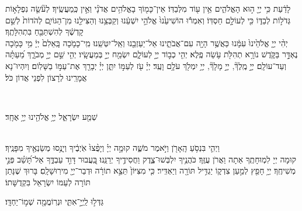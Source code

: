 \documentclass[twoside, openany, parskip=half, 11pt]{book}
\begin{document}

לָדַ֔עַת כִּ֥י יְיָ֖ ה֣וּא הָאֱלֹהִ֑ים אֵ֥ין ע֖וֹד מִלְּבַדּֽוֹ׃ \hfill \break
אֵין־כָּמ֖וֹךָ בָאֱלֹהִ֥ים אֲדֹנָ֗י וְאֵ֣ין כְּֽמַעֲשֶֽׂיךָ׃ \hfill \break
לְעֹ֘שֵׂ֤ה נִפְלָא֣וֹת גְּדֹל֣וֹת לְבַדּ֑וֹ כִּ֖י לְעוֹלָ֣ם חַסְדּֽוֹ׃ \hfill \break
וְאִמְר֕וּ הוֹשִׁיעֵ֙נוּ֙ אֱלֹהֵ֣י יִשְׁעֵ֔נוּ וְקַבְּצֵ֥נוּ וְהַצִּילֵ֖נוּ מִן־הַגּוֹיִ֑ם לְהֹדוֹת֙ לְשֵׁ֣ם קָדְשֶׁ֔ךָ לְהִשְׁתַּבֵּ֖חַ בִּתְהִלָּתֶֽךָ׃\\
יְהִ֨י יְיָ֤ אֱלֹהֵ֙ינוּ֙ עִמָּ֔נוּ כַּאֲשֶׁ֥ר הָיָ֖ה עִם־אֲבֹתֵ֑ינוּ אַל־יַעַזְבֵ֖נוּ וְאַֽל־יִטְּשֵֽׁנוּ׃ \hfill \break
מִֽי־כָמֹ֤כָה בָּֽאֵלִם֙ יְיָ֔ מִ֥י כָּמֹ֖כָה נֶאְדָּ֣ר בַּקֹּ֑דֶשׁ נוֹרָ֥א תְהִלֹּ֖ת עֹ֥שֵׂה פֶֽלֶא׃ \hfill \break
יְהִ֤י כְב֣וֹד יְיָ֣ לְעוֹלָ֑ם יִשְׂמַ֖ח יְיָ֣ בְּמַעֲשָֽׂיו׃ \hfill \break
יְהִ֤י שֵׁ֣ם יְיָ֣ מְבֹרָ֑ךְ מֵ֝עַתָּ֗ה וְעַד־עוֹלָֽם׃ \hfill \break
יְיָ֣ מֶֽלֶךְ֘, יְיָ֣ מָלָךְ֘, יְיָ֥ יִמְלֹ֖ךְ עֹלָ֥ם וָעֶֽד׃ \hfill \break
יְיָ֗ עֹ֖ז לְעַמּ֣וֹ יִתֵּ֑ן יְיָ֓ יְבָרֵ֖ךְ אֶת־עַמּ֣וֹ בַשָּׁלֽוֹם׃ \hfill \break
וְיִהְיוּ־נָא אֲמָרֵֽינוּ לְרָצוֹן לִפְנֵי אֲדוֹן כֹּל׃ \hfill \break

\vspace{-1.3\baselineskip}

\\
\begin{large}
שְׁמַ֖ע יִשְׂרָאֵ֑ל יְיָ֥ אֱלֹהֵ֖ינוּ יְיָ֥ אֶחָֽד׃
\end{large}

\\
וַיְהִ֛י בִּנְסֹ֥עַ הָֽאָרֹ֖ן וַיֹּ֣אמֶר מֹשֶׁ֑ה קוּמָ֣ה יְיָ֗ וְיָפֻ֨צוּ֙ אֹֽיְבֶ֔יךָ וְיָנֻ֥סוּ מְשַׂנְאֶ֖יךָ מִפָּנֶֽיךָ׃\\
קוּמָה יְיָ לִמְוּחָתֶֽךָ אַתָה וַאֲרֹן עֻזֶּֽךָ׃ \hfill \break
כֹּהֲנֶ֥יךָ יִלְבְּשׁוּ־צֶ֑דֶק וַחֲסִידֶ֥יךָ יְרַנֵּֽנוּ׃ \hfill \break
בַּֽ֭עֲבוּר דָּוִ֣ד עַבְדֶּ֑ךָ אַל־תָּ֝שֵׁ֗ב פְּנֵ֣י מְשִׁיחֶֽךָ׃ \hfill \break
יְיָ֥ חָפֵ֖ץ לְמַ֣עַן צִדְק֑וֹ יַגְדִּ֥יל תּוֹרָ֖ה וְיַאְדִּֽיר׃ \hfill \break
כִּ֤י מִצִּיּוֹן֙ תֵּצֵ֣א תוֹרָ֔ה וּדְבַר־יְיָ֖ מִירֽוּשָׁלָֽםִ׃ \hfill \break
בָּרוּךְ שֶׁנָּתַן תּוֹרָה לְעַמּוֹ יִשְׂרָאֵל בִּקְדֻשָּׁתוֹ׃ \hfill \break

\shatz
גַּדְּל֣וּ לַֽיְיָ֣־אִתִּ֑י וּנְרֽוֹמֲמָ֖ה שְׁמ֣וֹ־יַחְדָּֽו׃
\end{document}
